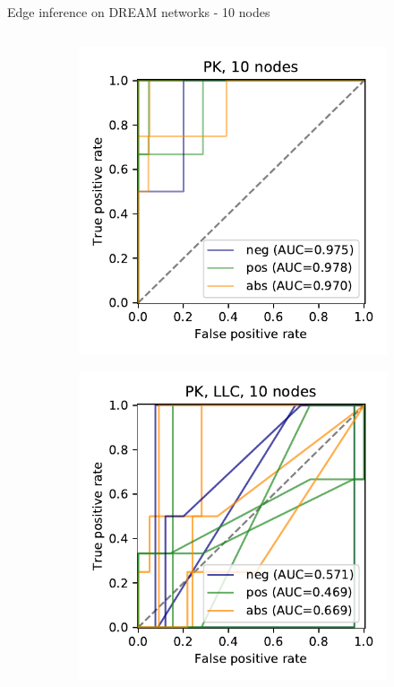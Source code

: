 \begin{frame}{Edge inference on DREAM networks - 10 nodes}
\begin{columns}
\begin{column}{0.6\textwidth}
\begin{figure}[ht]
\centering
\begin{subfigure}[b]{0.49\textwidth}\centering\caption{}
\includegraphics[width=\textwidth]{analysis/fig/roc_pk_10.pdf}
\end{subfigure}
\hfill
\begin{subfigure}[b]{0.49\textwidth}\centering\caption{}
\includegraphics[width=\textwidth]{analysis/fig/roc_pk_llc_10.pdf}

\end{subfigure}
\end{figure}
\end{column}
\end{columns}
\end{frame}
